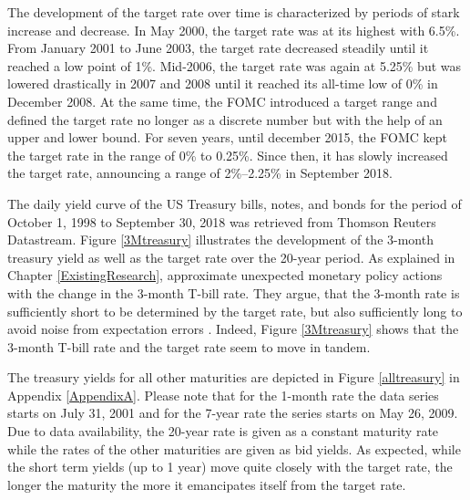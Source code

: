 \documentclass[11pt,a4paper,english,oneside]{book}
\numberwithin{equation}{chapter}
\begin{document}
The development of the target rate over time is characterized by periods of stark increase and decrease. In May 2000, the target rate was at its highest with 6.5\%. From January 2001 to June 2003, the target rate decreased steadily until it reached a low point of 1\%. Mid-2006, the target rate was again at 5.25\% but was lowered drastically in 2007 and 2008 until it reached its all-time low of 0\% in December 2008. At the same time, the FOMC introduced a target range and defined the target rate no longer as a discrete number but with the help of an upper and lower bound. For seven years, until december 2015, the FOMC kept the target rate in the range of 0\% to 0.25\%. Since then, it has slowly increased the target rate, announcing a range of 2\%--2.25\% in September 2018.
%

The daily yield curve of the US Treasury bills, notes, and bonds for the period of October 1, 1998 to September 30, 2018 was retrieved from Thomson Reuters Datastream. Figure \ref{3Mtreasury} illustrates the development of the 3-month treasury yield as well as the target rate over the 20-year period. As explained in Chapter \ref{ExistingResearch}, \citeauthor{Ellingsen.2003} approximate unexpected monetary policy actions with the change in the 3-month T-bill rate. They argue, that the 3-month rate is sufficiently short to be determined by the target rate, but also sufficiently long to avoid noise from expectation errors \citep[~p. 13]{Ellingsen.2003}. Indeed, Figure \ref{3Mtreasury} shows that the 3-month T-bill rate and the target rate seem to move in tandem.  

The treasury yields for all other maturities are depicted in Figure \ref{alltreasury} in Appendix \ref{AppendixA}. Please note that for the 1-month rate the data series starts on July 31, 2001 and for the 7-year rate the series starts on May 26, 2009. Due to data availability, the 20-year rate is given as a constant maturity rate while the rates of the other maturities are given as bid yields. As expected, while the short term yields (up to 1 year) move quite closely with the target rate, the longer the maturity the more it emancipates itself from the target rate. 

\end{document}
